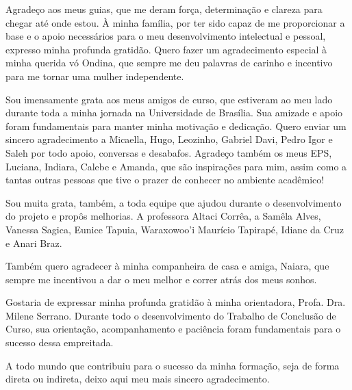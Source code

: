 \begin{agradecimentos}
    Agradeço aos meus guias, que me deram força, determinação e clareza para chegar até onde estou. À minha família, por ter sido capaz de me proporcionar a base e o apoio necessários para o meu desenvolvimento intelectual e pessoal, expresso minha profunda gratidão. Quero fazer um agradecimento especial à minha querida vó Ondina, que sempre me deu palavras de carinho e incentivo para me tornar uma mulher independente.

    Sou imensamente grata aos meus amigos de curso, que estiveram ao meu lado durante toda a minha jornada na Universidade de Brasília. Sua amizade e apoio foram fundamentais para manter minha motivação e dedicação. Quero enviar um sincero agradecimento a Micaella, Hugo, Leozinho, Gabriel Davi, Pedro Igor e Saleh por todo apoio, conversas e desabafos. Agradeço também os meus EPS, Luciana, Indiara, Calebe e Amanda, que são inspirações para mim, assim como a tantas outras pessoas que tive o prazer de conhecer no ambiente acadêmico!
    
    Sou muita grata, também, a toda equipe que ajudou durante o desenvolvimento do projeto e propôs melhorias. A professora Altaci Corrêa, a Samêla Alves, Vanessa Sagica, Eunice Tapuia, Waraxowoo'i Maurício Tapirapé, Idiane da Cruz e Anari Braz.

    Também quero agradecer à minha companheira de casa e amiga, Naiara, que sempre me incentivou a dar o meu melhor e correr atrás dos meus sonhos.
    
    Gostaria de expressar minha profunda gratidão à minha orientadora, Profa. Dra. Milene Serrano. Durante todo o desenvolvimento do Trabalho de Conclusão de Curso, sua orientação, acompanhamento e paciência foram fundamentais para o sucesso dessa empreitada.
    
    A todo mundo que contribuiu para o sucesso da minha formação, seja de forma direta ou indireta, deixo aqui meu mais sincero agradecimento.
\end{agradecimentos}
